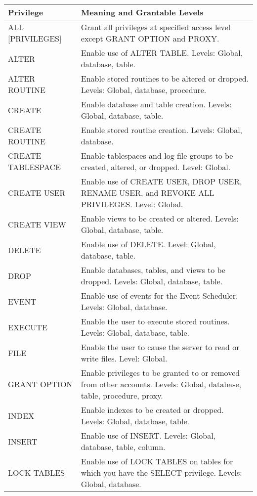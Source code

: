\documentclass[12pt]{scrbook}
\begin{document}
\begin{table}
      \hspace{-1.5cm}
      \begin{tabular}{l|p{5.5in}} 
      \hline
      \textbf{Privilege} & \textbf{Meaning and Grantable Levels} \\
      \hline
      ALL [PRIVILEGES] & Grant all privileges at specified access level except GRANT OPTION and PROXY. \\
      ALTER & Enable use of ALTER TABLE. Levels: Global, database, table. \\
      ALTER ROUTINE & Enable stored routines to be altered or dropped. Levels: Global, database, procedure. \\
      CREATE & Enable database and table creation. Levels: Global, database, table. \\
      CREATE ROUTINE & Enable stored routine creation. Levels: Global, database. \\
      CREATE TABLESPACE & Enable tablespaces and log file groups to be created, altered, or dropped. Level: Global. \\
      CREATE USER & Enable use of CREATE USER, DROP USER, RENAME USER, and REVOKE ALL PRIVILEGES. Level: Global. \\
      CREATE VIEW & Enable views to be created or altered. Levels: Global, database, table. \\
      DELETE & Enable use of DELETE. Level: Global, database, table. \\
      DROP  & Enable databases, tables, and views to be dropped. Levels: Global, database, table. \\
      EVENT & Enable use of events for the Event Scheduler. Levels: Global, database. \\
      EXECUTE & Enable the user to execute stored routines. Levels: Global, database, table. \\
      FILE  & Enable the user to cause the server to read or write files. Level: Global. \\
      GRANT OPTION & Enable privileges to be granted to or removed from other accounts. Levels: Global, database, table, procedure, proxy. \\
      INDEX & Enable indexes to be created or dropped. Levels: Global, database, table. \\
      INSERT & Enable use of INSERT. Levels: Global, database, table, column. \\
      LOCK TABLES & Enable use of LOCK TABLES on tables for which you have the SELECT privilege. Levels: Global, database. \\

\end{tabular}
\end{table}
\end{document}
